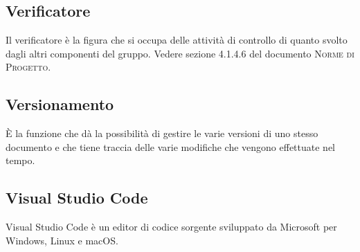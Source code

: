 
\subsection*{Verificatore}
Il verificatore è la figura che si occupa delle attività di controllo di quanto svolto dagli altri componenti del gruppo. Vedere sezione 4.1.4.6 del documento \textsc{Norme di Progetto}.

\subsection*{Versionamento}
È la funzione che dà la possibilità di gestire le varie versioni di uno stesso documento e che tiene
traccia delle varie modifiche che vengono effettuate nel tempo.

\subsection*{Visual Studio Code}
Visual Studio Code è un editor di codice sorgente sviluppato da Microsoft per Windows, Linux e macOS.

